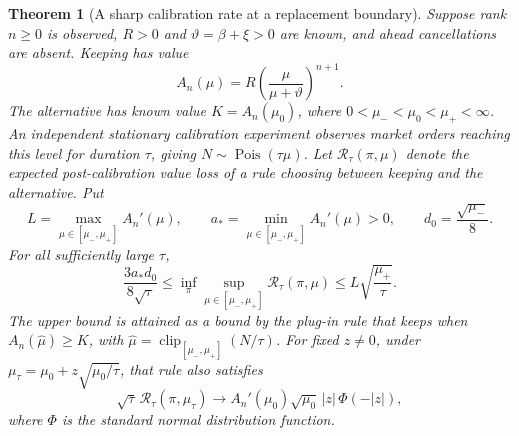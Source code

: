 \documentclass[11pt]{article}
\theoremstyle{plain}
\newtheorem{theorem}{Theorem}[section]
\theoremstyle{definition}
\theoremstyle{remark}
\begin{document}
\begin{theorem}[A sharp calibration rate at a replacement boundary]
\label{thm:queuestatrate}
Suppose rank \(n\ge0\) is observed, \(R>0\) and
\(\vartheta=\beta+\xi>0\) are known, and ahead cancellations are absent.
Keeping has value
\[
 A_n(\mu)=R\left(\frac{\mu}{\mu+\vartheta}\right)^{n+1}.
\]
The alternative has known value \(K=A_n(\mu_0)\), where
\(0<\mu_-<\mu_0<\mu_+<\infty\).
An independent stationary calibration experiment observes market
orders reaching this level for duration \(\tau\), giving
\(N\sim\operatorname{Pois}(\tau\mu)\).
Let \(\mathcal R_\tau(\pi,\mu)\) denote the expected post-calibration
value loss of a rule choosing between keeping and the alternative.
Put
\[
 L=\max_{\mu\in[\mu_-,\mu_+]} A_n'(\mu),\qquad
 a_*=\min_{\mu\in[\mu_-,\mu_+]} A_n'(\mu)>0,\qquad
 d_0=\frac{\sqrt{\mu_-}}8 .
\]
For all sufficiently large \(\tau\),
\begin{equation}\label{eq:queueminimaxrate}
 \frac{3a_*d_0}{8\sqrt{\tau}}
 \le \inf_\pi\sup_{\mu\in[\mu_-,\mu_+]}
                 \mathcal R_\tau(\pi,\mu)
 \le L\sqrt{\frac{\mu_+}{\tau}} .
\end{equation}
The upper bound is attained as a bound by the plug-in rule that
keeps when \(A_n(\widehat\mu)\ge K\), with
\(\widehat\mu=\operatorname{clip}_{[\mu_-,\mu_+]}(N/\tau)\).
For fixed \(z\ne0\), under
\(\mu_\tau=\mu_0+z\sqrt{\mu_0/\tau}\), that rule also satisfies
\begin{equation}\label{eq:queuelocallimit}
 \sqrt{\tau}\,\mathcal R_\tau(\pi,\mu_\tau)
 \longrightarrow
 A_n'(\mu_0)\sqrt{\mu_0}\,|z|\,\Phi(-|z|),
\end{equation}
where \(\Phi\) is the standard normal distribution function.
\end{theorem}
\end{document}
